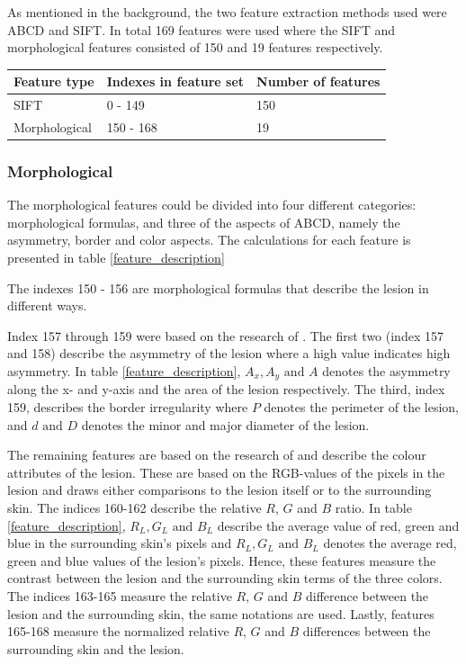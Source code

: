 \documentclass{kththesis}
\begin{document}
As mentioned in the background, the two feature extraction methods used were ABCD and SIFT. In total 169 features were used where the SIFT and morphological features consisted of 150 and 19 features respectively.
\begin{table}[h!]
  \begin{tabular}{|l|l|l|}
  \hline
  Feature type  & Indexes in feature set & Number of features \\ \hline
  SIFT          & 0 - 149                & 150                \\ \hline
  Morphological & 150 - 168              & 19                 \\ \hline
  \end{tabular}
  \end{table}

  
  \subsubsection{Morphological} %
  
  The morphological features could be divided into four different categories: morphological formulas, and three of the aspects of ABCD, namely the asymmetry, border and color aspects.
  The calculations for each feature is presented in table \ref{feature_description}
  
  The indexes 150 - 156 are morphological formulas that describe the lesion in different ways. %

  
  Index 157 through 159 were based on the research of \parencite{inproceedings}. The first two (index 157 and 158) describe the asymmetry of the lesion where a high value indicates high asymmetry. In table \ref{feature_description}, \(A_x, A_y \textrm{ and } A\) denotes the asymmetry along the x- and y-axis and the area of the lesion respectively. The third, index 159, describes the border irregularity where \(P\) denotes the perimeter of the lesion, and \(d \textrm{ and } D\) denotes the minor and major diameter of the lesion.

  The remaining features are based on the research of \parencite{celebi2008automatic} and describe the colour attributes of the lesion. These are based on the RGB-values of the pixels in the lesion and draws either comparisons to the lesion itself or to the surrounding skin. 
  The indices 160-162 describe the relative $R$, $G$ and $B$ ratio. In table \ref{feature_description}, \(R_L, G_L \textrm{ and } B_L\) describe the average value of red, green and blue in the surrounding skin's pixels and \(R_L, G_L \textrm{ and } B_L\) denotes the average red, green and blue values of the lesion's pixels. Hence, these features measure the contrast between the lesion and the surrounding skin terms of the three colors. The indices 163-165 measure the relative $R$, $G$ and $B$ difference between the lesion and the surrounding skin, the same notations are used. Lastly, features 165-168 measure the normalized relative $R$, $G$ and $B$ differences between the surrounding skin and the lesion. \parencite{celebi2008automatic}
\end{document}
